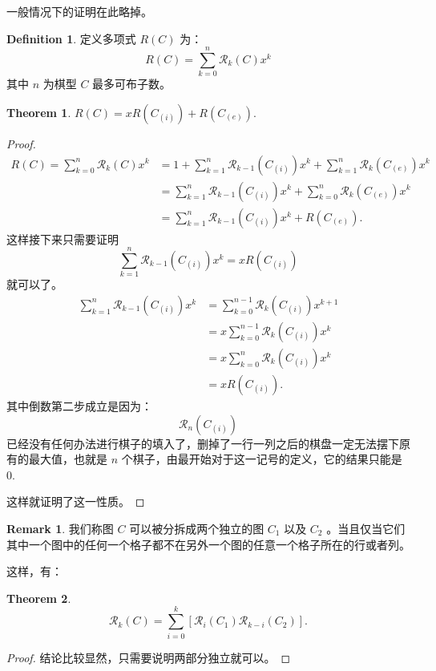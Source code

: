 \documentclass[oneside]{book}
\theoremstyle{definition}
\newtheorem{definition}{Definition}[section]
\newtheorem{theorem}{Theorem}[section]
\newtheorem{remark}{Remark}[section]
\begin{document}
	一般情况下的证明在此略掉。
	\begin{definition}
		定义多项式 \( R(C) \) 为：
		\[
		R(C) = \sum_{k = 0}^n \mathscr{R}_k(C) x^k
		\]
		其中 \( n \) 为棋型 \( C \) 最多可布子数。
			\end{definition}
		\begin{theorem}
			\(R(C) = xR(C_{(i)}) + R(C_{(e)}).\)
		\end{theorem}
		\begin{proof}
			\[
			\begin{aligned}
				R(C) =\sum_{k = 0}^n \mathscr{R}_k(C) x^k &= 1+\sum_{k = 1}^{n} \mathscr{R}_{k - 1}(C_{(i)}) x^k + \sum_{k = 1}^n \mathscr{R}_k(C_{(e)}) x^k \\
				&= \sum_{k = 1}^{n} \mathscr{R}_{k - 1}(C_{(i)}) x^k + \sum_{k = 0}^n \mathscr{R}_k(C_{(e)}) x^k \\
				&= \sum_{k = 1}^{n} \mathscr{R}_{k - 1}(C_{(i)}) x^k +R(C_{(e)}).
			\end{aligned}
			\]
			这样接下来只需要证明
			\[
			\sum_{k = 1}^{n} \mathscr{R}_{k - 1}(C_{(i)}) x^k=xR(C_{(i)})
			\]
			就可以了。
			\[
			\begin{aligned}
				\sum_{k = 1}^{n} \mathscr{R}_{k - 1}(C_{(i)}) x^k &= \sum_{k = 0}^{n-1} \mathscr{R}_{k}(C_{(i)}) x^{k+1}\\
				&= x\sum_{k = 0}^{n-1} \mathscr{R}_{k}(C_{(i)}) x^{k}\\
				&=x\sum_{k = 0}^{n} \mathscr{R}_{k}(C_{(i)}) x^{k}\\
				&=xR(C_{(i)}).
			\end{aligned}
			\]
			其中倒数第二步成立是因为：
			\[
			\mathscr{R}_{n}(C_{(i)})
			\]
			已经没有任何办法进行棋子的填入了，删掉了一行一列之后的棋盘一定无法摆下原有的最大值，也就是 \( n \) 个棋子，由最开始对于这一记号的定义，它的结果只能是0.
			
			这样就证明了这一性质。
		\end{proof}
		
	\begin{remark}
		我们称图 \( C \) 可以被分拆成两个独立的图 \( C_1 \) 以及 \( C_2 \) 。当且仅当它们其中一个图中的任何一个格子都不在另外一个图的任意一个格子所在的行或者列。
	\end{remark}
	
	这样，有：
	\begin{theorem}
		\[
		\mathscr{R}_k(C)=\sum_{i=0}^k\left[\mathscr{R}_i(C_1)\mathscr{R}_{k-i}(C_2)\right].
		\]
	\end{theorem}
	\begin{proof}
		结论比较显然，只需要说明两部分独立就可以。
	\end{proof}
\end{document}
